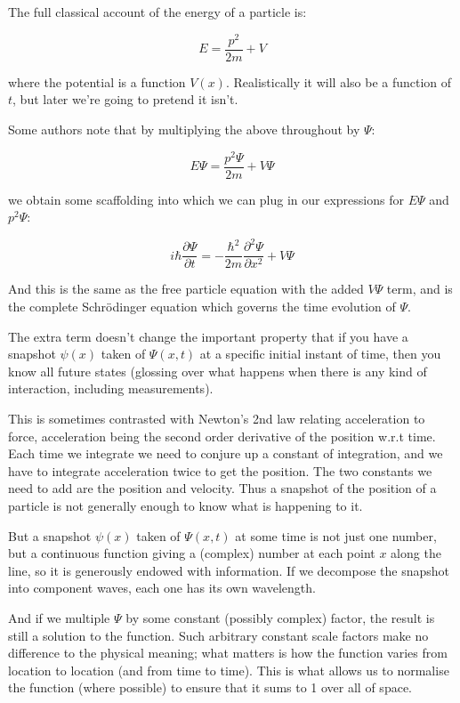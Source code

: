 The full classical account of the energy of a particle is:

$$
E = \frac{p^2}{2m} + V
$$

where the potential is a function $V(x)$. Realistically it will also be a function of $t$, but later we're going to pretend it isn't.

Some authors note that by multiplying the above throughout by $\Psi$:

$$
E\Psi = \frac{p^2{\Psi}}{2m} + V{\Psi}
$$

we obtain some scaffolding into which we can plug in our expressions for $E \Psi$ and $p^2 \Psi$:

\begin{equation}
i\hbar \frac{\partial \Psi}{\partial t}
=
- \frac{\hbar^2}{2m} \frac{\partial^2 \Psi}{\partial x^2}
+ V{\Psi}
\label{eqn:se}
\end{equation}

And this is the same as the free particle equation with the added $V\Psi$ term, and is the complete Schrödinger equation which governs the time evolution of $\Psi$.

The extra term doesn't change the important property that if you have a snapshot $\psi(x)$ taken of $\Psi(x, t)$ at a specific initial instant of time, then you know all future states (glossing over what happens when there is any kind of interaction, including measurements).

This is sometimes contrasted with Newton's 2nd law relating acceleration to force, acceleration being the second order derivative of the position w.r.t time. Each time we integrate we need to conjure up a constant of integration, and we have to integrate acceleration twice to get the position. The two constants we need to add are the position and velocity. Thus a snapshot of the position of a particle is not generally enough to know what is happening to it.

But a snapshot $\psi(x)$ taken of $\Psi(x, t)$ at some time is not just one number, but a continuous function giving a (complex) number at each point $x$ along the line, so it is generously endowed with information. If we decompose the snapshot into component waves, each one has its own wavelength.

And if we multiple $\Psi$ by some constant (possibly complex) factor, the result is still a solution to the function. Such arbitrary constant scale factors make no difference to the physical meaning; what matters is how the function varies from location to location (and from time to time). This is what allows us to normalise the function (where possible) to ensure that it sums to 1 over all of space.

